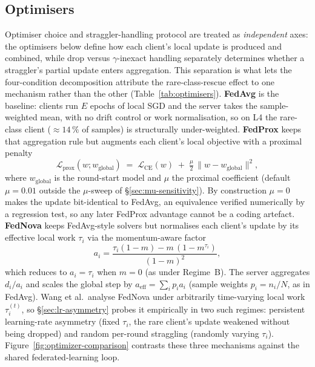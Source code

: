 \documentclass[11pt,a4paper]{report}
\begin{document}
\subsection{Optimisers}
\label{sec:method-optimisers}

Optimiser choice and straggler-handling protocol are treated as \emph{independent}
axes: the optimisers below define how each client's local update is produced and
combined, while drop versus $\gamma$-inexact handling separately determines whether
a straggler's partial update enters aggregation. This separation is what lets the
four-condition decomposition attribute the rare-class-rescue effect to one
mechanism rather than the other (Table~\ref{tab:optimisers}). \textbf{FedAvg}
\citep{mcmahan2017fedavg} is the baseline: clients run $E$ epochs of local SGD and
the server takes the sample-weighted mean, with no drift control or work
normalisation, so on L4 the rare-class client ($\approx 14\,\%$ of samples) is
structurally under-weighted. \textbf{FedProx} \citep{li2020fedprox} keeps that
aggregation rule but augments each client's local objective with a proximal
penalty
\[
  \mathcal{L}_{\textrm{prox}}(w; w_{\textrm{global}})
  \;=\; \mathcal{L}_{\textrm{CE}}(w) \;+\; \tfrac{\mu}{2}\,
        \lVert w - w_{\textrm{global}} \rVert^{2},
\]
where $w_{\textrm{global}}$ is the round-start model and $\mu$ the proximal
coefficient (default $\mu = 0.01$ outside the $\mu$-sweep of
\S\ref{sec:mu-sensitivity}). By construction $\mu = 0$ makes the update
bit-identical to FedAvg, an equivalence verified numerically by a regression test,
so any later FedProx advantage cannot be a coding artefact. \textbf{FedNova}
\citep{wang2020fednova} keeps FedAvg-style solvers but normalises each client's
update by its effective local work $\tau_i$ via the momentum-aware factor
\[
  a_i = \frac{\tau_i(1-m) - m\,(1 - m^{\tau_i})}{(1-m)^{2}},
\]
which reduces to $a_i = \tau_i$ when $m = 0$ (as under Regime~B). The server
aggregates $d_i / a_i$ and scales the global step by
$a_{\textrm{eff}} = \sum_i p_i a_i$ (sample weights $p_i = n_i/N$, as in FedAvg). Wang et al.\ analyse FedNova under
arbitrarily time-varying local work $\tau_i^{(t)}$, so
\S\ref{sec:lr-asymmetry} probes it empirically in two such regimes: persistent
learning-rate asymmetry (fixed $\tau_i$, the rare client's update weakened
without being dropped) and random per-round straggling (randomly varying
$\tau_i$).
Figure~\ref{fig:optimizer-comparison} contrasts these three mechanisms against the
shared federated-learning loop.
\end{document}
